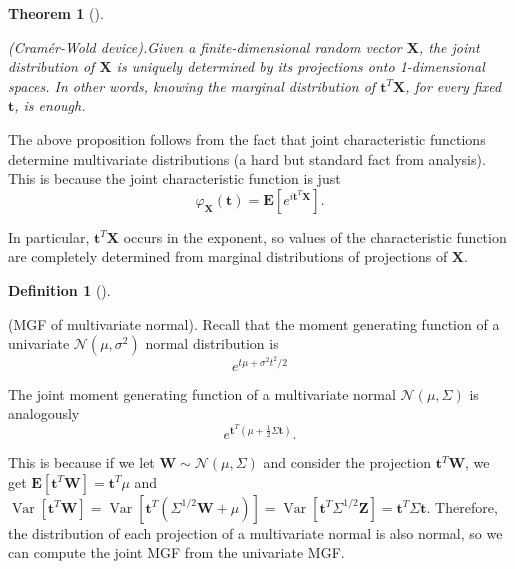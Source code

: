 \documentclass[
  letterpaper,
  DIV=11,
  numbers=noendperiod]{scrreprt}
\theoremstyle{definition}
\newtheorem{definition}{Definition}[chapter]
\theoremstyle{plain}
\newtheorem{theorem}{Theorem}[chapter]
\theoremstyle{remark}
\begin{document}

\leavevmode{}%
\begin{theorem}[]\label{thm-moment-MVN}

(Cramér-Wold device).Given a finite-dimensional random vector
\(\mathbf{X}\), the joint distribution of \(\mathbf{X}\) is uniquely
determined by its projections onto 1-dimensional spaces. In other words,
knowing the marginal distribution of \(\mathbf{t}^T \mathbf{X}\), for
every fixed \(\mathbf{t}\), is enough.

\end{theorem}

The above proposition follows from the fact that joint characteristic
functions determine multivariate distributions (a hard but standard fact
from analysis). This is because the joint characteristic function is
just \[
\varphi_{\mathbf{X}}(\mathbf{t})=\mathbf{E}\left[e^{i \mathbf{t}^T \mathbf{X}}\right] .
\]

In particular, \(\mathbf{t}^T \mathbf{X}\) occurs in the exponent, so
values of the characteristic function are completely determined from
marginal distributions of projections of \(\mathbf{X}\).

\leavevmode{}%
\begin{definition}[]\label{def-mgf-mvn}

(MGF of multivariate normal). Recall that the moment generating function
of a univariate \(\mathcal{N}\left(\mu, \sigma^2\right)\) normal
distribution is \[
e^{t \mu+\sigma^2 t^2 / 2}
\]

The joint moment generating function of a multivariate normal
\(\mathcal{N}(\mu, \Sigma)\) is analogously \[
e^{\mathbf{t}^T\left(\mu+\frac{1}{2} \Sigma \mathbf{t}\right)} .
\]

This is because if we let \(\mathbf{W} \sim \mathcal{N}(\mu, \Sigma)\)
and consider the projection \(\mathbf{t}^T \mathbf{W}\), we get
\(\mathbf{E}\left[\mathbf{t}^T \mathbf{W}\right]=\mathbf{t}^T \mu\) and
\(\operatorname{Var}\left[\mathbf{t}^T \mathbf{W}\right]=\operatorname{Var}\left[\mathbf{t}^T\left(\Sigma^{1 / 2} \mathbf{W}+\mu\right)\right]=\operatorname{Var}\left[\mathbf{t}^T \Sigma^{1 / 2} \mathbf{Z}\right]=\mathbf{t}^T \Sigma \mathbf{t}\).
Therefore, the distribution of each projection of a multivariate normal
is also normal, so we can compute the joint MGF from the univariate MGF.

\end{definition}
\end{document}
